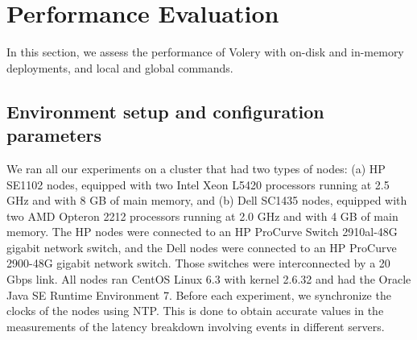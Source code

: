 \section{Performance Evaluation}
\label{sec:evaluation}


In this section, we assess the performance of Volery with on-disk and in-memory deployments, and local and global commands.

\subsection{Environment setup and configuration parameters}
\label{sec:environment}

We ran all our experiments on a cluster that had two types of nodes: (a) HP SE1102 nodes, equipped with two Intel Xeon L5420 processors running at 2.5 GHz and with 8 GB of main memory, and (b) Dell SC1435 nodes, equipped with two AMD Opteron 2212 processors running at 2.0 GHz and with 4 GB of main memory. The HP nodes were connected to an HP ProCurve Switch 2910al-48G gigabit network switch, and the Dell nodes were connected to an HP ProCurve 2900-48G gigabit network switch. Those switches were interconnected by a 20 Gbps link. 
All nodes ran CentOS Linux 6.3 with kernel 2.6.32 and had the Oracle Java SE Runtime Environment 7.
Before each experiment, we synchronize the clocks of the nodes using NTP.
This is done to obtain accurate values in the measurements of the latency breakdown involving events in different servers.

